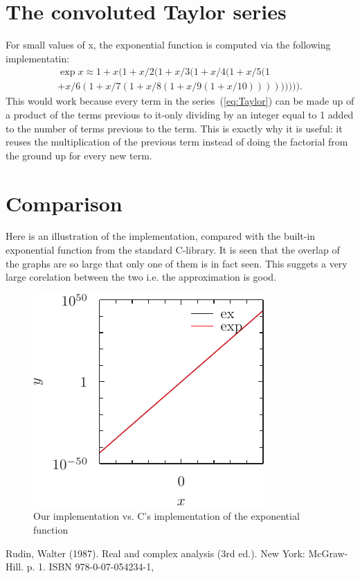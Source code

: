 \documentclass[twocolumn]{article}
\begin{document}
\section{The convoluted Taylor series}
For small values of x, the exponential function
is computed via the following implementatin:
	\begin{equation}\label{eq:Taylor}
	\begin{aligned}
\exp x \approx 1+x(1+x/2(1+x/3(1+x/4(1+x/5(1 \\
+x/6(1+x/7(1+x/8(1+x/9(1+x/10))))))))).
	\end{aligned}
	\end{equation}
This would work because every term in the series~(\ref{eq:Taylor})
can be made up of a product of the terms previous to it-only dividing by an integer
equal to 1 added to the number of terms previous to the term.
This is exactly why it is useful: it reuses the multiplication of the previous term
instead of doing the factorial from the ground up for every new term.

\section{Comparison}
Here is an illustration of the implementation, compared with the built-in
exponential function from the standard C-library.
It is seen that the overlap of the graphs are so large that only one of them is in fact seen.
This suggets a very large corelation between the two i.e. the approximation is good.


	\begin{figure}[h]
\centering
\includegraphics{fig-pyxplot.pdf}
\caption{Our implementation vs. C's implementation of the exponential function}
\label{fig:pyxplot}
	\end{figure}

\clearpage
\begin{thebibliography}{9}
 Rudin, Walter (1987). Real and complex analysis (3rd ed.).
New York: McGraw-Hill. p. 1. ISBN 978-0-07-054234-1,
\end{thebibliography}
\end{document}
